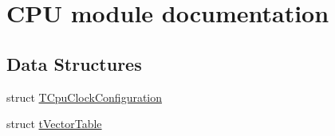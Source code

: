 \hypertarget{group___c_p_u__module}{}\section{C\+PU module documentation}
\label{group___c_p_u__module}
\subsection*{Data Structures}
\begin{DoxyCompactItemize}
\item 
struct \hyperlink{struct_t_cpu_clock_configuration}{T\+Cpu\+Clock\+Configuration}
\item 
struct \hyperlink{structt_vector_table}{t\+Vector\+Table}
\end{DoxyCompactItemize}
